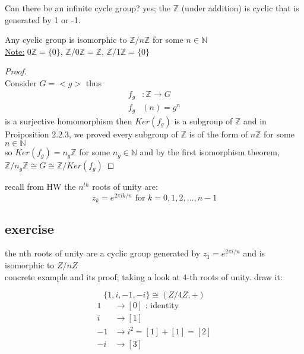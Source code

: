 \documentclass{article}
\begin{document}
Can there be an infinite cycle group? yes; the $\mathbb{Z}$ (under addition) is cyclic that is generated by 1 or -1. 
 \begin{proposition}
    Any cyclic group is isomorphic to $\mathbb{Z} / n\mathbb{Z}$ for some $n \in \mathbb{N}$ \\ \underline{Note:} $0\mathbb{Z} =\{0\}$, $\mathbb{Z} / 0\mathbb{Z} = \mathbb{Z }$, $\mathbb{Z} / 1\mathbb{Z} = \{0\}$

 \end{proposition}
 \begin{proof}  \leavevmode \\ 
    Consider $G = <g>$ thus \begin{align*}
        f_g &: \mathbb{Z} \to G \\ 
        f_g&(n) = g^n 
    \end{align*}
    is a surjective homomorphism then $Ker (f_g) $ is a subgroup of $\mathbb{Z}$ and in  Proiposition 2.2.3, we proved every subgroup of $\mathbb{Z}$ is of the form of $n\mathbb{Z}$ for some $n\in \mathbb{N}$ \\ 
    so $Ker(f_g) = n_g \mathbb{Z}$ for some $n_g \in \mathbb{N}$ and by the first isomorphism theorem, $\mathbb{Z} / n_g \mathbb{Z} \cong G \cong \mathbb{Z} / Ker(f_g) $




\end{proof}

recall from HW the $n^{th}$ roots of unity are: $$z_k = e^{2\pi i k / n} \text{ for } k = 0, 1, 2, \ldots, n-1$$

 \subsection{exercise} 
 the nth roots of unity are a cyclic group generated by $z_1 = e^{2\pi i / n}$ and is isomorphic to $Z / nZ$ 
\\ 
 concrete example and its proof; taking a look at $4$-th roots of unity. draw it: 
    
 $$\{1,i,-1, -i\} \cong (Z / 4Z, + )$$ \begin{align*}
    1 &\to [0] \text{ :  identity}\\
    i &\to [1] \\
    -1 &\to i^2 = [1] + [1] = [2]  \\
    -i &\to [3]
 \end{align*}
    \\ 
\end{document}
